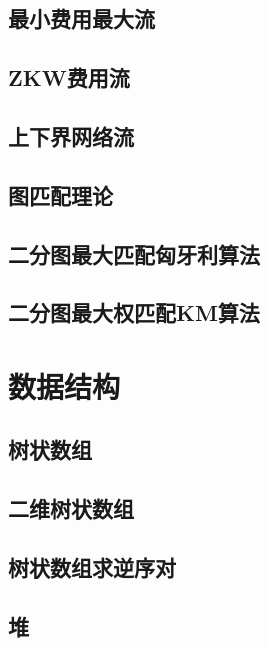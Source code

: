 \section{最小费用最大流}
\raggedbottom
\hrulefill
\section{ZKW费用流}
\raggedbottom
\hrulefill
\section{上下界网络流}
\raggedbottom
\hrulefill
\section{图匹配理论}
\raggedbottom
\hrulefill
\section{二分图最大匹配匈牙利算法}
\raggedbottom
\hrulefill
\section{二分图最大权匹配KM算法}
\raggedbottom
\hrulefill

\chapter{数据结构}
\section{树状数组}
\raggedbottom
\hrulefill
\section{二维树状数组}
\raggedbottom
\hrulefill
\section{树状数组求逆序对}
\raggedbottom
\hrulefill
\section{堆}
\raggedbottom
\hrulefill
